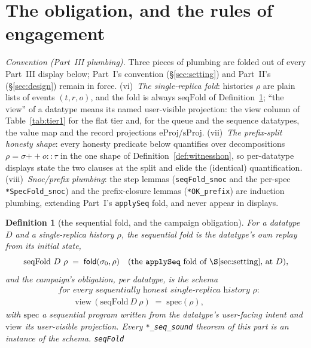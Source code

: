 \documentclass[11pt]{article}
\newtheorem{definition}[theorem]{Definition}
\newcommand{\Sinit}{\sigma_0}
\newcommand{\lean}[1]{\texttt{#1}}
\newcommand{\fold}{\mathsf{fold}}
\begin{document}
\section{The obligation, and the rules of engagement}
\label{sec:obligation}

\emph{Convention (Part~III plumbing).} Three pieces of plumbing are
folded out of every Part~III display below; Part~I's convention
(\S\ref{sec:setting}) and Part~II's (\S\ref{sec:design}) remain in
force. (vi)~\emph{The single-replica fold}: histories $\rho$ are plain
lists of events $(t, r, o)$, and the fold is always
$\mathrm{seqFold}$ of Definition~\ref{def:seqfold}; ``the view'' of a
datatype means its named user-visible projection: the view column
of Table~\ref{tab:tier1} for the flat tier and, for the queue and the
sequence datatypes, the value map and the record projections
$\mathrm{eProj}$/$\mathrm{sProj}$. (vii)~\emph{The prefix-split
honesty shape}: every honesty predicate below quantifies over
decompositions $\rho = \sigma \mathbin{+\!\!+} o :: \tau$ in the one
shape of Definition~\ref{def:witnesshon}, so per-datatype displays
state the two clauses at the split and elide the (identical)
quantification. (viii)~\emph{Snoc/prefix plumbing}: the step lemmas
(\lean{seqFold\_snoc} and the per-spec \lean{*SpecFold\_snoc}) and the
prefix-closure lemmas (\lean{*OK\_prefix}) are induction plumbing,
extending Part~I's \lean{applySeq} fold, and never appear in displays.

\begin{definition}[the sequential fold, and the campaign obligation]
\label{def:seqfold}
For a datatype $D$ and a single-replica history $\rho$, the
\emph{sequential fold} is the datatype's own replay from its initial
state,
\[
  \mathrm{seqFold}\ D\ \rho \;=\; \fold(\Sinit, \rho)
  \quad (\text{the } \lean{applySeq} \text{ fold of \S\ref{sec:setting},
  at } D) ,
\]
and the campaign's obligation, per datatype, is the schema
\[
\begin{aligned}
  &\textit{for every sequentially honest single-replica history }
    \rho : \\
  &\qquad \mathrm{view}\,(\mathrm{seqFold}\ D\ \rho)
    \;=\; \mathrm{spec}(\rho) ,
\end{aligned}
\]
with $\mathrm{spec}$ a sequential program written from the datatype's
user-facing intent and $\mathrm{view}$ its user-visible projection.
Every \lean{*\_seq\_sound} theorem of this part is an instance of the
schema.
\hfill\lean{seqFold}
\end{definition}
\end{document}
